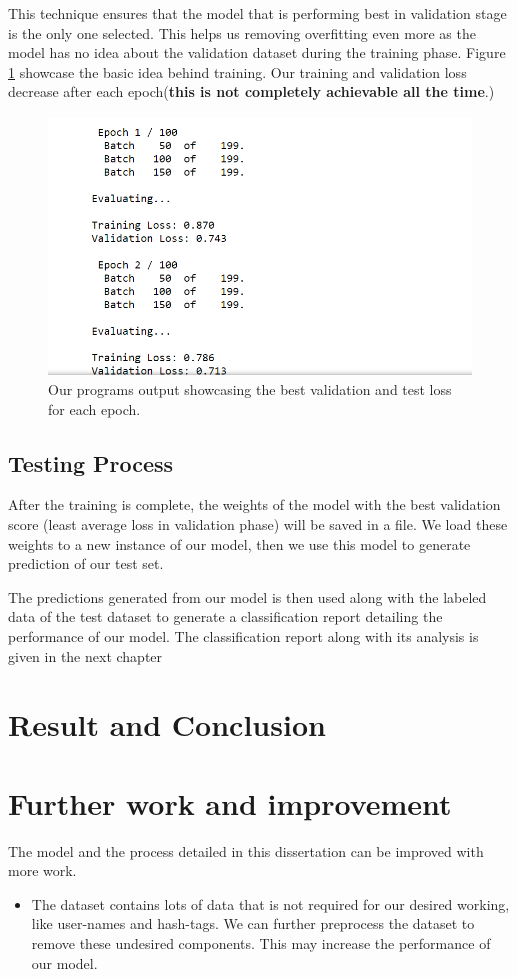 \documentclass[a4paper, 12pt]{article}
\begin{document}
\begin{sloppypar}
  This technique ensures that the model that is performing best in validation stage is the only one selected. This helps us removing overfitting even more as the model has no idea about the validation dataset during the training phase. Figure \ref{eval} showcase the basic idea behind training. Our training and validation loss decrease after each epoch(\textbf{this is not completely achievable all the time}.)
  \begin{figure}[H]
  \begin{center}
  \includegraphics[scale=0.65]{eval.png}
  \caption{Our programs output showcasing the best validation and test loss for each epoch.\label{eval}}
  \end{center}
  \end{figure}
  \subsection{Testing Process}
  
  After the training is complete, the weights of the model with the best validation score (least average loss in validation phase) will be saved in a file. We load these weights to a new instance of our model, then we use this model to generate prediction of our test set.
  
  The predictions generated from our model is then used along with the labeled data of the test dataset to generate a classification report detailing the performance of our model. The classification report along with its analysis is given in the next chapter
  \clearpage
  \section{Result and Conclusion}
  \clearpage
  \section{Further work and improvement}
  The model and the process detailed in this dissertation can be improved with more work. 
  \begin{itemize}
  \item The dataset contains lots of data that is not required for our desired working, like user-names and hash-tags. We can further preprocess the dataset to remove these undesired components. This may increase the performance of our model.
  

\end{itemize}
\end{sloppypar}
\end{document}
